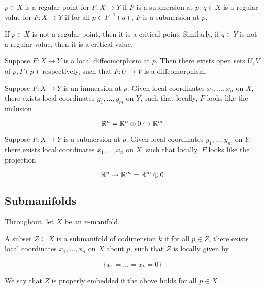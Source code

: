 \begin{definition}

    \(p \in X\) is a regular point for \(F : X \to Y\) if \(F\) is a submersion at \(p\). \(q \in X\) is a regular value for \(F : X \to Y\) if for all \(p \in F^{-1}(q)\), \(F\) is a submersion at \(p\).

    If \(p \in X\) is not a regular point, then it is a critical point. Similarly, if \(q \in Y\) is not a regular value, then it is a critical value.
\end{definition}

\begin{lemma}
    Suppose \(F : X \to Y\) is a local diffeomorphism at \(p\). Then there exists open sets \(U, V\) of \(p, F(p)\) respectively, such that \(F : U \to V\) is a diffeomorphism.
\end{lemma}

\begin{lemma}

    Suppose \(F : X \to Y\) is an immersion at \(p\). Given local coordinates \(x_1, \dots, x_n\) on \(X\), there exists local coordinates \(y_1, \dots, y_m\) on \(Y\), such that locally, \(F\) looks like the inclusion

    \[\mathbb{R}^n = \mathbb{R}^n \oplus 0 \hookrightarrow \mathbb{R}^m\]
\end{lemma}

\begin{lemma}

    Suppose \(F : X \to Y\) is a submersion at \(p\). Given local coordinates \(y_1, \dots, y_m\) on \(Y\), there exists local coordinates \(x_1, \dots, x_n\) on \(X\), such that locally, \(F\) looks like the projection

    \[\mathbb{R}^n \to \mathbb{R}^m = \mathbb{R}^m \oplus 0\]
\end{lemma}

\subsection{Submanifolds}

Throughout, let \(X\) be an \(n\)-manifold.

\begin{definition}
    [submanifold] A subset \(Z \subseteq X\) is a submanifold of codimension \(k\) if for all \(p \in Z\), there exists local coordinates \(x_1, \dots, x_n\) on \(X\) about \(p\), such that \(Z\) is locally given by

    \[\{x_1= \dots = x_k = 0\}\]

    We say that \(Z\) is properly embedded if the above holds for all \(p \in X\).
\end{definition}

